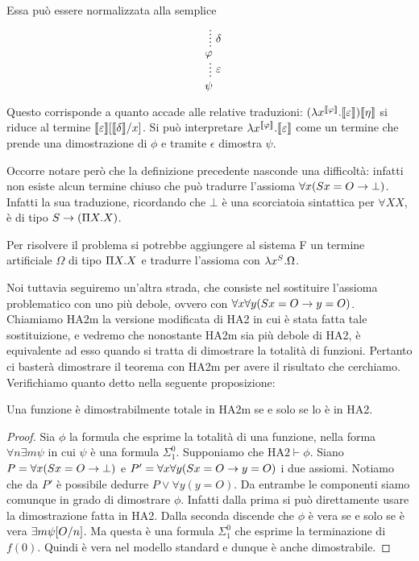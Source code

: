 \documentclass[]{marticle}
\begin{document}
Essa pu\`o essere normalizzata alla semplice 
\[
    \begin{prooftree}
        \hypo{}
        \ellipsis{$\delta$}{\phi}
        \ellipsis{$\epsilon$}{\psi}
    \end{prooftree}
\]

Questo corrisponde a quanto accade alle relative traduzioni: $(\l x^{\cod{\phi}}.
\cod{\epsilon})\cod{\eta}$ si riduce al termine
$\cod{\epsilon}\sub{\cod{\delta}}{x}$. Si pu\`o interpretare $\l x^{\cod{\phi}}.
\cod{\epsilon}$ come un termine che prende una dimostrazione di $\phi$ e tramite
$\epsilon$ dimostra $\psi$.

Occorre notare per\`o che la definizione precedente nasconde una difficolt\`a:
infatti non esiste alcun termine chiuso che pu\`o tradurre l'assioma $\forall x
(Sx=O \rar \bot)$. Infatti la sua traduzione, ricordando che $\bot$ \`e una
scorciatoia sintattica per $\forall XX$, \`e di tipo $S\rar (\P X.X)$. 

Per risolvere il problema si potrebbe aggiungere al sistema F un termine
artificiale $\Omega$ di tipo $\P X.X$ e tradurre l'assioma con $\l x^S.\Omega$.

Noi tuttavia seguiremo un'altra strada, che consiste nel sostituire l'assioma
problematico con uno pi\`u debole, ovvero con $\forall x \forall y (Sx=O\rar
y=O)$. Chiamiamo HA2m la versione modificata di HA2 in cui \`e stata fatta
tale sostituizione, e vedremo che nonostante HA2m sia pi\`u debole di HA2, \`e
equivalente ad esso quando si tratta di dimostrare la totalit\`a di funzioni.
Pertanto ci baster\`a dimostrare il teorema con HA2m per avere il risultato che
cerchiamo. Verifichiamo quanto detto nella seguente proposizione:

\begin{block}[Proposizione]
    Una funzione \`e dimostrabilmente totale in HA2m se e solo se lo \`e in HA2.
\end{block}
\begin{proof}
    Sia $\phi$ la formula che esprime la totalit\`a di una funzione, nella forma 
    $\forall n \exists m \psi$ in cui $\psi$ \`e una formula $\Sigma^0_1$.
    Supponiamo che $\text{HA2}\vdash\phi$.
    Siano $P = \forall x (Sx=O\rar \bot)$ e $P' = \forall x \forall y (Sx=O\rar
    y=O)$ i due assiomi. Notiamo che da $P'$ \`e possibile dedurre $P \lor
    \forall y(y=O)$. Da entrambe le componenti siamo comunque in grado di
    dimostrare $\phi$. Infatti dalla prima si pu\`o direttamente usare la
    dimostrazione fatta in HA2. Dalla seconda discende che $\phi$ \`e vera se e
    solo se \`e vera $\exists m \psi\sub{O}{n}$. Ma questa \`e una formula
    $\Sigma^0_1$ che esprime la terminazione di $f(0)$. Quindi \`e vera nel
    modello standard e dunque \`e anche dimostrabile.
\end{proof}
\end{document}
